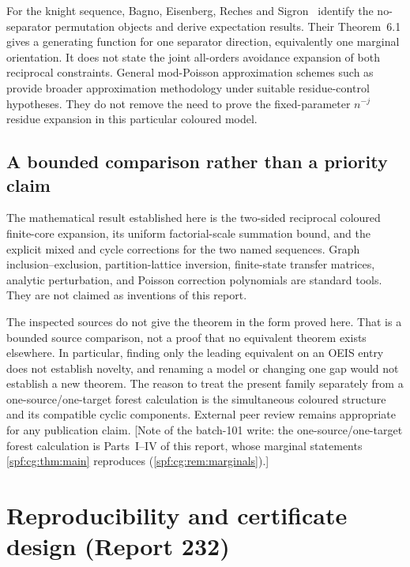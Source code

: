 \documentclass[11pt]{article}
\numberwithin{equation}{section}
\theoremstyle{definition}
\theoremstyle{remark}
\theoremstyle{definition}
\begin{document}
For the knight sequence, Bagno, Eisenberg, Reches and Sigron~\cite{cgBagno}
identify the no-separator permutation objects and derive expectation
results. Their Theorem~6.1 gives a generating function for one separator
direction, equivalently one marginal orientation. It does not state the
joint all-orders avoidance expansion of both reciprocal constraints.
General mod-Poisson approximation schemes such as~\cite{cgModPoisson}
provide broader approximation methodology under suitable residue-control
hypotheses. They do not remove the need to prove the fixed-parameter
$n^{-j}$ residue expansion in this particular coloured model.

\subsection{A bounded comparison rather than a priority claim}
The mathematical result established here is the two-sided reciprocal
coloured finite-core expansion, its uniform factorial-scale summation
bound, and the explicit mixed and cycle corrections for the two named
sequences. Graph inclusion--exclusion, partition-lattice inversion,
finite-state transfer matrices, analytic perturbation, and Poisson
correction polynomials are standard tools. They are not claimed as
inventions of this report.

The inspected sources do not give the theorem in the form proved here.
That is a bounded source comparison, not a proof that no equivalent theorem
exists elsewhere. In particular, finding only the leading equivalent on an
OEIS entry does not establish novelty, and renaming a model or changing
one gap would not establish a new theorem. The reason to treat the present
family separately from a one-source/one-target forest calculation is the
simultaneous coloured structure and its compatible cyclic components.
External peer review remains appropriate for any publication claim.
[Note of the batch-101 write: the one-source/one-target forest calculation
is Parts~I--IV of this report, whose marginal statements
\cref{spf:cg:thm:main} reproduces (\cref{spf:cg:rem:marginals}).]

\section{Reproducibility and certificate design (Report 232)}
\label{spf:cg:sec:repro}
\end{document}
